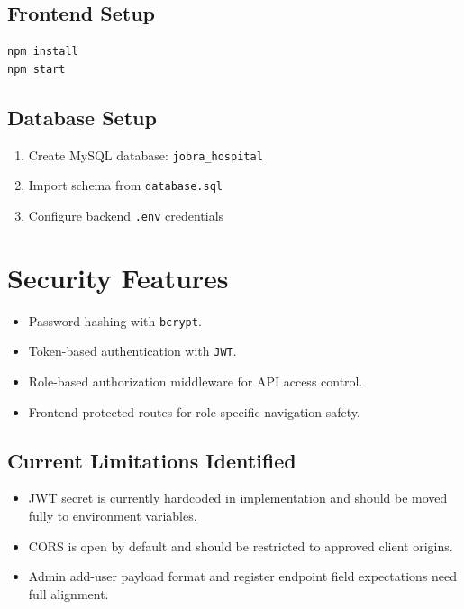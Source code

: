 \documentclass[12pt,a4paper]{article}
\begin{document}
\subsection{Frontend Setup}
\begin{verbatim}
npm install
npm start
\end{verbatim}

\subsection{Database Setup}
\begin{enumerate}[leftmargin=1.2cm]
    \item Create MySQL database: \texttt{jobra\_hospital}
    \item Import schema from \texttt{database.sql}
    \item Configure backend \texttt{.env} credentials
\end{enumerate}

\section{Security Features}
\begin{itemize}[leftmargin=1.2cm]
    \item Password hashing with \texttt{bcrypt}.
    \item Token-based authentication with \texttt{JWT}.
    \item Role-based authorization middleware for API access control.
    \item Frontend protected routes for role-specific navigation safety.
\end{itemize}

\subsection{Current Limitations Identified}
\begin{itemize}[leftmargin=1.2cm]
    \item JWT secret is currently hardcoded in implementation and should be moved fully to environment variables.
    \item CORS is open by default and should be restricted to approved client origins.
    \item Admin add-user payload format and register endpoint field expectations need full alignment.
\end{itemize}
\end{document}
